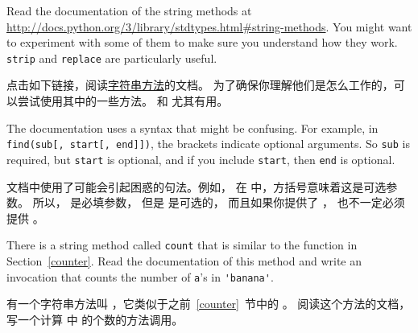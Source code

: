 \begin{exercise}
  

Read the documentation of the string methods at
\url{http://docs.python.org/3/library/stdtypes.html#string-methods}.
You might want to experiment with some of them to make sure you
understand how they work.  {\tt strip} and {\tt replace} are
particularly useful.

点击如下链接，阅读\href{http://docs.python.org/3/library/stdtypes.html#string-methods}{字符串方法}的文档。  为了确保你理解他们是怎么工作的，可以尝试使用其中的一些方法。  和  尤其有用。

The documentation uses a syntax that might be confusing.
For example, in \verb"find(sub[, start[, end]])", the brackets
indicate optional arguments.  So {\tt sub} is required, but
{\tt start} is optional, and if you include {\tt start},
then {\tt end} is optional.

文档中使用了可能会引起困惑的句法。例如， 在  中，方括号意味着这是可选参数。 所以， 是必填参数， 但是  是可选的， 而且如果你提供了  ， 也不一定必须提供  。

  

\end{exercise}


\begin{exercise}
  

There is a string method called {\tt count} that is similar
to the function in Section~\ref{counter}.  Read the documentation
of this method
and write an invocation that counts the number of {\tt a}'s
in \verb"'banana'".

有一个字符串方法叫  ，它类似于之前~\ref{counter}~节中的  。 阅读这个方法的文档， 写一个计算  中  的个数的方法调用。


\end{exercise}


